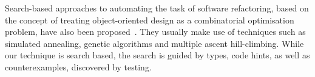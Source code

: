 \documentclass[sigconf,review,anonymous]{acmart}
\begin{document}
Search-based approaches to automating the task of software refactoring,
based on the concept of treating object-oriented design as a combinatorial
optimisation problem, have also been proposed~\cite{search1,search2}.  They
usually make use of techniques such as simulated annealing, genetic
algorithms and multiple ascent hill-climbing.
%
%
While our technique is search based, the search is guided by types, code
hints, as well as counterexamples, discovered by testing.
\end{document}
